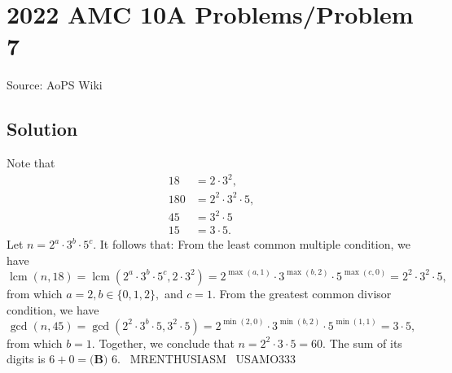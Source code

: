 \documentclass[12pt]{article}
\begin{document}
\section*{{2022 AMC 10A Problems/Problem 7}}
Source: AoPS Wiki

\subsection*{Solution}
Note that \begin{align*} 18 &= 2\cdot3^2, \\ 180 &= 2^2\cdot3^2\cdot5, \\ 45 &= 3^2\cdot5 \\ 15 &= 3\cdot5. \end{align*} Let $n = 2^a\cdot3^b\cdot5^c.$ It follows that: From the least common multiple condition, we have \[\operatorname{lcm}(n,18) = \operatorname{lcm}(2^a\cdot3^b\cdot5^c,2\cdot3^2) = 2^{\max(a,1)}\cdot3^{\max(b,2)}\cdot5^{\max(c,0)} = 2^2\cdot3^2\cdot5,\] from which $a=2, b\in\{0,1,2\},$ and $c=1.$ From the greatest common divisor condition, we have \[\gcd(n,45) = \gcd(2^2\cdot3^b\cdot5,3^2\cdot5) = 2^{\min(2,0)}\cdot3^{\min(b,2)}\cdot5^{\min(1,1)} = 3\cdot5,\] from which $b=1.$ Together, we conclude that $n=2^2\cdot3\cdot5=60.$ The sum of its digits is $6+0=\boxed{\textbf{(B) } 6}.$ ~MRENTHUSIASM ~USAMO333
\end{document}
